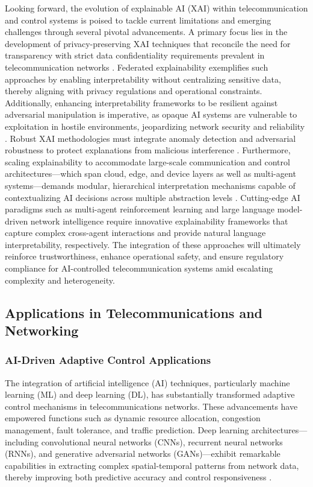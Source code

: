 Looking forward, the evolution of explainable AI (XAI) within telecommunication and control systems is poised to tackle current limitations and emerging challenges through several pivotal advancements. A primary focus lies in the development of privacy-preserving XAI techniques that reconcile the need for transparency with strict data confidentiality requirements prevalent in telecommunication networks \cite{ref48}. Federated explainability exemplifies such approaches by enabling interpretability without centralizing sensitive data, thereby aligning with privacy regulations and operational constraints. Additionally, enhancing interpretability frameworks to be resilient against adversarial manipulation is imperative, as opaque AI systems are vulnerable to exploitation in hostile environments, jeopardizing network security and reliability \cite{ref50}. Robust XAI methodologies must integrate anomaly detection and adversarial robustness to protect explanations from malicious interference \cite{ref54}. Furthermore, scaling explainability to accommodate large-scale communication and control architectures—which span cloud, edge, and device layers as well as multi-agent systems—demands modular, hierarchical interpretation mechanisms capable of contextualizing AI decisions across multiple abstraction levels \cite{ref55}. Cutting-edge AI paradigms such as multi-agent reinforcement learning and large language model-driven network intelligence require innovative explainability frameworks that capture complex cross-agent interactions and provide natural language interpretability, respectively. The integration of these approaches will ultimately reinforce trustworthiness, enhance operational safety, and ensure regulatory compliance for AI-controlled telecommunication systems amid escalating complexity and heterogeneity.

\subsection{Applications in Telecommunications and Networking}

\subsubsection{AI-Driven Adaptive Control Applications}

The integration of artificial intelligence (AI) techniques, particularly machine learning (ML) and deep learning (DL), has substantially transformed adaptive control mechanisms in telecommunications networks. These advancements have empowered functions such as dynamic resource allocation, congestion management, fault tolerance, and traffic prediction. Deep learning architectures---including convolutional neural networks (CNNs), recurrent neural networks (RNNs), and generative adversarial networks (GANs)---exhibit remarkable capabilities in extracting complex spatial-temporal patterns from network data, thereby improving both predictive accuracy and control responsiveness \cite{ref1,ref2,ref3,ref4,ref5,ref6,ref7,ref10,ref11,ref14,ref50}.

